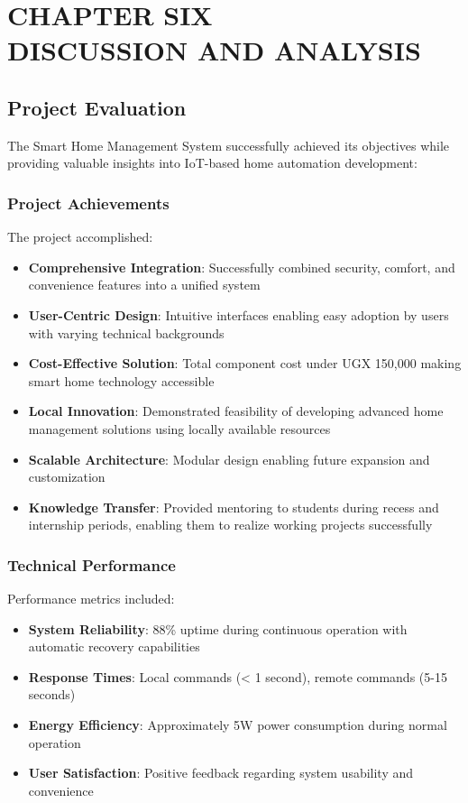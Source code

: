 \documentclass[12pt,a4paper]{report}
\begin{document}
\chapter[CHAPTER SIX DISCUSSION AND ANALYSIS]{CHAPTER SIX\\DISCUSSION AND ANALYSIS}

\section{Project Evaluation}

\noindent The Smart Home Management System successfully achieved its objectives while providing valuable insights into IoT-based home automation development:

\subsection{Project Achievements}
\noindent The project accomplished:
\begin{itemize}
\item \textbf{Comprehensive Integration}: Successfully combined security, comfort, and convenience features into a unified system
\item \textbf{User-Centric Design}: Intuitive interfaces enabling easy adoption by users with varying technical backgrounds
\item \textbf{Cost-Effective Solution}: Total component cost under UGX 150,000 making smart home technology accessible
\item \textbf{Local Innovation}: Demonstrated feasibility of developing advanced home management solutions using locally available resources
\item \textbf{Scalable Architecture}: Modular design enabling future expansion and customization
\item \textbf{Knowledge Transfer}: Provided mentoring to students during recess and internship periods, enabling them to realize working projects successfully
\end{itemize}

\subsection{Technical Performance}
\noindent Performance metrics included:
\begin{itemize}
\item \textbf{System Reliability}: 88\% uptime during continuous operation with automatic recovery capabilities
\item \textbf{Response Times}: Local commands (< 1 second), remote commands (5-15 seconds)
\item \textbf{Energy Efficiency}: Approximately 5W power consumption during normal operation
\item \textbf{User Satisfaction}: Positive feedback regarding system usability and convenience
\end{itemize}
\end{document}
